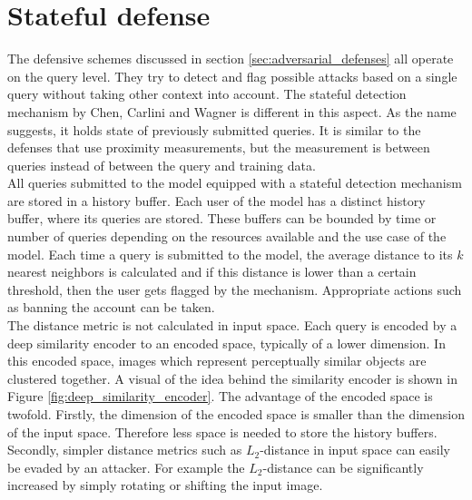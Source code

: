 \section{Stateful defense}\label{sec:stateful_detection}
The defensive schemes discussed in section \ref{sec:adversarial_defenses} all operate on the query level. They try to detect and flag possible attacks based on a single query without taking other context into account. The stateful detection mechanism by Chen, Carlini and Wagner \cite{chen_stateful_2019} is different in this aspect. As the name suggests, it holds state of previously submitted queries. It is similar to the defenses that use proximity measurements, but the measurement is between queries instead of between the query and training data.\\

All queries submitted to the model equipped with a stateful detection mechanism are stored in a history buffer. Each user of the model has a distinct history buffer, where its queries are stored. These buffers can be bounded by time or number of queries depending on the resources available and the use case of the model. Each time a query is submitted to the model, the average distance to its $k$ nearest neighbors is calculated and if this distance is lower than a certain threshold, then the user gets flagged by the mechanism. Appropriate actions such as banning the account can be taken.\\

The distance metric is not calculated in input space. Each query is encoded by a deep similarity encoder \cite{deep_similarity_encoder} to an encoded space, typically of a lower dimension. In this encoded space, images which represent perceptually similar objects are clustered together. A visual of the idea behind the similarity encoder is shown in Figure \ref{fig:deep_similarity_encoder}. The advantage of the encoded space is twofold. Firstly, the dimension of the encoded space is smaller than the dimension of the input space. Therefore less space is needed to store the history buffers. Secondly, simpler distance metrics such as $L_2$-distance in input space can easily be evaded by an attacker. For example the $L_2$-distance can be significantly increased by simply rotating or shifting the input image.\\

